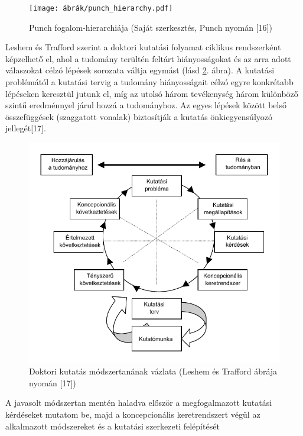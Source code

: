 \documentclass[12pt,magyar,a4paper,oneside]{scrreprt}
\begin{document}
\begin{figure}
\hypertarget{fig:punch}{%
\centering
\texttt{[image: ábrák/punch\_hierarchy.pdf]}
\caption{Punch fogalom-hierarchiája (Saját szerkesztés, Punch nyomán
{[}16{]})}\label{fig:punch}
}
\end{figure}

Leshem és Trafford szerint a doktori kutatási folyamat ciklikus
rendszerként képzelhető el, ahol a tudomány terültén feltárt
hiányosságokat és az arra adott válaszokat célzó lépések sorozata váltja
egymást (lásd \ref{fig:doktori}. ábra). A kutatási problémától a
kutatási tervig a tudomány hiányosságait célzó egyre konkrétabb
lépéseken keresztül jutunk el, míg az utolsó három tevékenység három
különböző szintű eredménnyel járul hozzá a tudományhoz. Az egyes lépések
között belső összefüggések (szaggatott vonalak) biztosítják a kutatás
önkiegyensúlyozó jellegét{[}17{]}.

\begin{figure}
\hypertarget{fig:doktori}{%
\centering
\includegraphics{ábrák/doktori-kutatás-vizualizációja_Leshem.pdf}
\caption{Doktori kutatás módszertanának vázlata (Leshem és Trafford
ábrája nyomán {[}17{]})}\label{fig:doktori}
}
\end{figure}

A javasolt módszertan mentén haladva először a megfogalmazott kutatási
kérdéseket mutatom be, majd a koncepcionális keretrendszert végül az
alkalmazott módszereket és a kutatási szerkezeti felépítését
\end{document}
